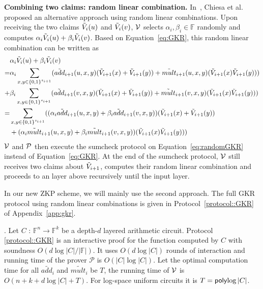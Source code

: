 \smallskip\noindent\textbf{Combining two claims: random linear combination.}  In~\cite{zksumcheck}, Chiesa et al. proposed an alternative approach using random linear combinations. Upon receiving the two claims $\tV_i(u)$ and $\tV_i(v)$, $\V$ selects $\alpha_i, \beta_i\in\mathbb{F}$ randomly and computes $\alpha_i\tV_i(u)+\beta_i\tV_i(v)$. Based on Equation~\ref{eq:GKR}, this random linear combination can be written as
{\footnotesize
\begin{align}\label{eq:randomGKR}
&\alpha_i\tV_i(u)+\beta_i\tV_i(v)\nonumber\\
=&\alpha_i\sum_{x, y \in\binary^{s_{i+1}}}(\tadd_{i+1}(u,x,y)(\tV_{i+1}(x)+\tV_{i+1}(y))+\tmult_{i+1}(u,x,y)(\tV_{i+1}(x)\tV_{i+1}(y)))\nonumber\\+&\beta_i\sum_{x, y \in\binary^{s_{i+1}}}(\tadd_{i+1}(v,x,y)(\tV_{i+1}(x)+\tV_{i+1}(y))+\tmult_{i+1}(v,x,y)(\tV_{i+1}(x)\tV_{i+1}(y)))\nonumber\\
=&\sum_{x, y \in\binary^{s_{i+1}}}((\alpha_i\tadd_{i+1}(u,x,y)+\beta_i\tadd_{i+1}(v,x,y))(\tV_{i+1}(x)+\tV_{i+1}(y))\nonumber\\
&+(\alpha_i\tmult_{i+1}(u,x,y)+\beta_i\tmult_{i+1}(v,x,y))(\tV_{i+1}(x)\tV_{i+1}(y)))
\end{align}
}
$\V$ and $\P$ then execute the sumcheck protocol on Equation~\ref{eq:randomGKR} instead of Equation~\ref{eq:GKR}. At the end of the sumcheck protocol, $\V$ still receives two claims about $\tV_{i+1}$, computes their random linear combination and proceeds to an layer above recursively until the input layer.

In our new ZKP scheme, we will mainly use the second approach. The full GKR protocol using random linear combinations is given in Protocol~\ref{protocol::GKR} of Appendix~\ref{app:gkr}.

\begin{theorem}\cite{VSA13}\cite{JT_Thesis}\cite{CMT}\cite{GKR}. Let $C$ : $\mathbb{F}^n \rightarrow \mathbb{F}^k$ be a depth-$d$ layered arithmetic circuit. Protocol \ref{protocol::GKR} is an interactive proof for the function computed by $C$ with soundness $O(d\log {|C|}/|\mathbb{F}|)$. It uses $O(d \log |C|)$ rounds of interaction and running time of the prover $\mathcal{P}$ is $O(|C|\log |C|)$. Let the optimal computation time for all $\tilde{add_i}$ and $\tilde{mult_i}$ be $T$, the running time of $\V$ is $O(n+k+d\log |C|+T)$. For log-space uniform circuits it is $T=\poly{\log |C|}$.
\end{theorem}
